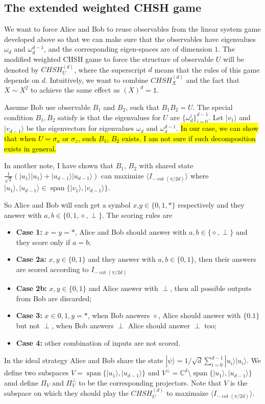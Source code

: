 \documentclass[11pt,letterpaper]{article}
\newcommand{\ket}[1]{|#1\rangle}
\DeclareMathOperator{\spn}{span}
\newcommand{\C}{\mathbb{C}}
\newcommand{\1}{\mathbb{1}}
\newcommand{\CHSH}{CHSH^{(d)}}
\theoremstyle{definition}
\begin{document}
\subsection{The extended weighted CHSH game}
We want to force Alice and Bob to reuse observables 
from the linear system game developed above so that we can make sure that the observables have
eigenvalues $\omega_d$ and $\omega_d^{d-1}$, and the corresponding eigen-spaces are 
of dimension $1$. The modified weighted CHSH game to force the structure of observable $U$ will be
denoted by $\CHSH_U$, where the superscript $d$ means that the rules of this game depends on $d$.
Intuitively, we want to combine $\CHSH_X$ and the fact that $X \sim X^2$ to achieve the same effect as 
$(X)^d = \1$.

Assume Bob use observable $B_1$ and $B_2$, such that $B_1B_2 = U$. 
The special condition $B_1, B_2$ satisfy is that the eigenvalues for 
$U$ are $\{\omega_d^i\}_{i=0}^{d-1}$. Let $\ket{v_1}$ and $\ket{v_{d-1}}$ be the 
eigenvectors for eigenvalues $\omega_d$ and $\omega_d^{d-1}$. 
\hl{In our case, we can show that when $U = \sigma_x$ or $\sigma_z$, such $B_1$, $B_2$ exists. I am not sure if such decomposition exists in general.}

In another note, I have shown that $B_1$, $B_2$ with shared state $\frac{1}{\sqrt{2}} (\ket{u_1}\ket{u_1} + \ket{u_{d-1}}\ket{u_{d-1}})$ 
can maximize $\langle I_{-\cot(\pi/2d)}\rangle$ where $\ket{u_1}, \ket{u_{d-1}} \in \spn\{\ket{v_1}, \ket{v_{d-1}}\}$.

So Alice and Bob will each get a symbol $x$,$y \in \{ 0, 1, \ast\}$ respectively and they answer with $a,b \in \{0,1,\diamond,\perp\}$. 
The scoring rules are
\begin{itemize}
	\item \textbf{Case 1:} $x = y = \ast$, Alice and Bob should answer with $a, b \in \{\diamond, \perp\}$ and 
	they score only if $a = b$;
	\item \textbf{Case 2a:} $x,y \in \{0,1\}$ and they answer with $a,b \in \{0,1\}$, then
	their answers are scored according to $I_{-\cot(\pi/2d)}$
	\item \textbf{Case 2b:} $x,y \in \{0,1\}$ and Alice answer with $\perp$, then all possible outputs from Bob
	are discarded;
	\item \textbf{Case 3:} $x \in {0,1}, y = \ast$, when Bob answers $\diamond$, Alice should answer with $\{0.1\}$ but not $\perp$,
	when Bob answers $\perp$ Alice should answer $\perp$ too;
	\item \textbf{Case 4:} other combination of inputs are not scored.
\end{itemize}
In the ideal strategy Alice and Bob share the state $\ket{\psi} =1/\sqrt{d} \sum_{i=0}^{d-1} \ket{u_i}\ket{u_i}$.
We define two subspaces $V = \spn\{\ket{u_1}, \ket{u_{d-1}}\}$ and $V^\perp = \C^d \setminus\spn\{\ket{u_1}, \ket{u_{d-1}}\}$ amd
define $\Pi_V$ and $\Pi_{V}^\perp$ to be the corresponding projectors. Note that $V$ is the subspace on which they should play the 
$\CHSH_U$ to maximaize $\langle I_{-\cot(\pi/2d)} \rangle$.
\end{document}
